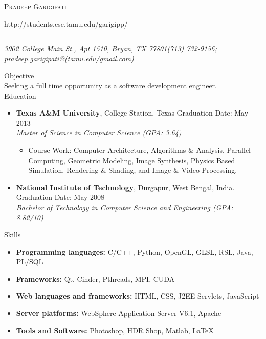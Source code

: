 \documentclass[11pt,oneside]{article}
\makeatletter
\newcommand{\name}{Pradeep Garigipati}
\newcommand{\addr}{3902 College Main St., Apt 1510, Bryan, TX 77801}
\newcommand{\phone}{(713) 732-9156}
\newcommand{\email}{pradeep.garigipati@(tamu.edu/gmail.com)}
\newcommand{\web}{http://students.cse.tamu.edu/garigipp/}
\newcommand{\bigname}[1]{
  \begin{center}\fontfamily{phv}\selectfont\Huge\scshape#1\end{center}
}
\newenvironment{ressection}[1]{
  \vspace{4pt}
  {\fontfamily{phv}\selectfont\Large#1}
  \begin{itemize}
  \vspace{3pt}
}{
  \end{itemize}
}
\newcommand{\resitem}[1]{
  \vspace{-4pt}
  \item \begin{flushleft} #1 \end{flushleft}
}
\newcommand{\ressubitem}[1]{
  \vspace{-1pt}
  \item \begin{flushleft} #1 \end{flushleft}
}
\newcommand{\resbigitem}[4]{
  \vspace{-5pt}
  \item
  \textbf{#1}, #2 \hfill #4\\
  \textit{#3}
}
\newenvironment{ressubsec}[4]{
  \resbigitem{#1}{#2}{#3}{#4}
  \vspace{-2pt}
  \begin{itemize}
}{
  \end{itemize}
}
\newenvironment{ressubsec2}[4]{
  \resbigitem{#1}{#2}{#3}{#4}
}
\makeatother
\begin{document}
 \selectfont
\bigname{\name}  
\begin{center} \web \end{center}
\vspace{-8pt} \rule{\textwidth}{1pt}
\vspace{-1pt} {\small\itshape \addr \hfill \phone; \email}
\vspace{8 pt}

{\selectfont\Large Objective}\\
Seeking a full time opportunity as a software development engineer.\\

\begin{ressection}{Education}
  \begin{ressubsec}{Texas A\&M University}{College Station, Texas}{Master of Science in Computer Science (GPA: 3.64)}{Graduation Date: May 2013}
    \ressubitem{Course Work: Computer Architecture, Algorithms \& Analysis, Parallel Computing, Geometric Modeling, Image Synthesis, Physics Based Simulation, Rendering \& Shading, and Image \& Video Processing.}
  \end{ressubsec}
  \begin{ressubsec2}{National Institute of Technology}{Durgapur, West Bengal, India.}{Bachelor of Technology in Computer Science and Engineering (GPA: 8.82/10)}{Graduation Date: May 2008}
  \end{ressubsec2}
\end{ressection}

\begin{ressection}{Skills}

  \resitem{\textbf{Programming languages:} C/C++, Python, OpenGL, GLSL, RSL, Java, PL/SQL}
  \resitem{\textbf{Frameworks:} Qt, Cinder, Pthreads, MPI, CUDA}
  \resitem{\textbf{Web languages and frameworks:} HTML, CSS, J2EE Servlets, JavaScript}
  \resitem{\textbf{Server platforms:} WebSphere Application Server V6.1, Apache}
  \resitem{\textbf{Tools and Software:} Photoshop, HDR Shop, Matlab, \LaTeX{}}

\end{ressection}
\end{document}
